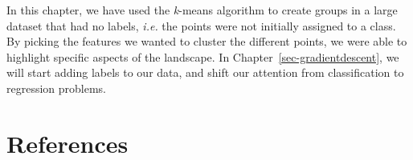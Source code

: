 \documentclass[
  letterpaper,
]{scrbook}
\begin{document}
In this chapter, we have used the \emph{k}-means algorithm to create
groups in a large dataset that had no labels, \emph{i.e.} the points
were not initially assigned to a class. By picking the features we
wanted to cluster the different points, we were able to highlight
specific aspects of the landscape. In Chapter~\ref{sec-gradientdescent},
we will start adding labels to our data, and shift our attention from
classification to regression problems.

\section*{References}\label{bibliography-2}


\label{refs-2}
\end{document}
